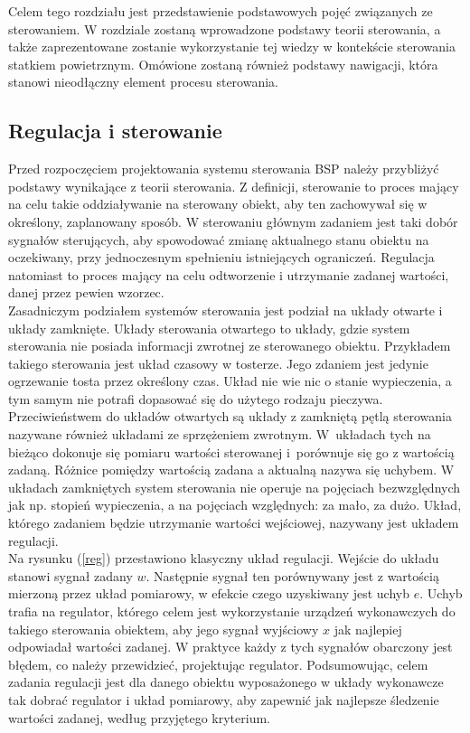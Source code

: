 Celem tego rozdziału jest przedstawienie podstawowych pojęć związanych ze sterowaniem. W rozdziale zostaną wprowadzone podstawy teorii sterowania, a także zaprezentowane zostanie wykorzystanie tej wiedzy w kontekście sterowania statkiem powietrznym. Omówione zostaną również podstawy nawigacji, która stanowi nieodłączny element procesu sterowania.

\subsection{Regulacja i sterowanie}

Przed rozpoczęciem projektowania systemu sterowania BSP należy przybliżyć podstawy wynikające z teorii sterowania. Z definicji, sterowanie to proces mający na celu takie oddziaływanie na sterowany obiekt, aby ten zachowywał się w określony, zaplanowany sposób. W sterowaniu głównym zadaniem jest taki dobór sygnałów sterujących, aby spowodować zmianę aktualnego stanu obiektu na oczekiwany, przy jednoczesnym spełnieniu istniejących ograniczeń. Regulacja natomiast to proces mający na celu odtworzenie i utrzymanie zadanej wartości, danej przez pewien wzorzec.\\

Zasadniczym podziałem systemów sterowania jest podział na układy otwarte i układy zamknięte. Układy sterowania otwartego to układy, gdzie system sterowania nie posiada informacji zwrotnej ze sterowanego obiektu. Przykładem takiego sterowania jest układ czasowy w tosterze. Jego zdaniem jest jedynie ogrzewanie tosta przez określony czas. Układ nie wie nic o stanie wypieczenia, a tym samym nie potrafi dopasować się do użytego rodzaju pieczywa. Przeciwieństwem do układów otwartych są układy z zamkniętą pętlą sterowania nazywane również układami ze sprzężeniem zwrotnym. W~układach tych na bieżąco dokonuje się pomiaru wartości sterowanej i~porównuje się go z wartością zadaną. Różnice pomiędzy wartością zadana a aktualną nazywa się uchybem. W układach zamkniętych system sterowania nie operuje na pojęciach bezwzględnych jak np. stopień wypieczenia, a na pojęciach względnych: za mało, za dużo. Układ, którego zadaniem będzie utrzymanie wartości wejściowej, nazywany jest układem regulacji.\\

Na rysunku (\ref{reg}) przestawiono klasyczny układ regulacji.  Wejście do układu stanowi sygnał zadany $w$. Następnie sygnał ten porównywany jest z wartością mierzoną przez układ pomiarowy, w efekcie czego uzyskiwany jest uchyb $e$. Uchyb trafia na regulator, którego celem jest wykorzystanie urządzeń wykonawczych do takiego sterowania obiektem, aby jego sygnał wyjściowy $x$ jak najlepiej odpowiadał wartości zadanej. W praktyce każdy z tych sygnałów obarczony jest błędem, co należy przewidzieć, projektując regulator. Podsumowując, celem zadania regulacji jest dla danego obiektu wyposażonego w układy wykonawcze tak dobrać regulator i układ pomiarowy, aby zapewnić jak najlepsze śledzenie wartości zadanej, według przyjętego kryterium.

